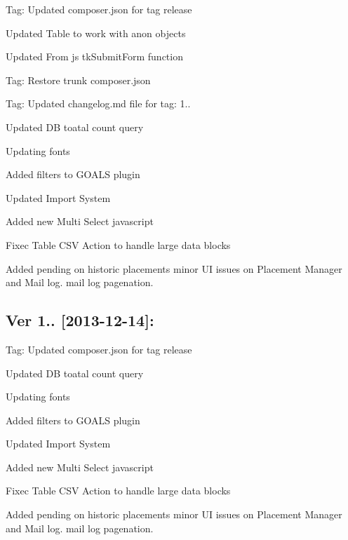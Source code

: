 \begin{DoxyItemize}
\item Tag\+: Updated composer.\+json for tag release
\item Updated Table to work with anon objects
\item Updated From js tk\+Submit\+Form function
\item Tag\+: Restore trunk composer.\+json
\item Tag\+: Updated changelog.\+md file for tag\+: 1..
\item Updated D\+B toatal count query
\item Updating fonts
\item Added filters to G\+O\+A\+L\+S plugin
\item Updated Import System
\item Added new Multi Select javascript
\item Fixec Table C\+S\+V Action to handle large data blocks
\item Added pending on historic placements minor U\+I issues on Placement Manager and Mail log. mail log pagenation.
\end{DoxyItemize}

\subsection*{Ver 1.. \mbox{[}2013-\/12-\/14\mbox{]}\+: }


\begin{DoxyItemize}
\item Tag\+: Updated composer.\+json for tag release
\item Updated D\+B toatal count query
\item Updating fonts
\item Added filters to G\+O\+A\+L\+S plugin
\item Updated Import System
\item Added new Multi Select javascript
\item Fixec Table C\+S\+V Action to handle large data blocks
\item Added pending on historic placements minor U\+I issues on Placement Manager and Mail log. mail log pagenation. 
\end{DoxyItemize}